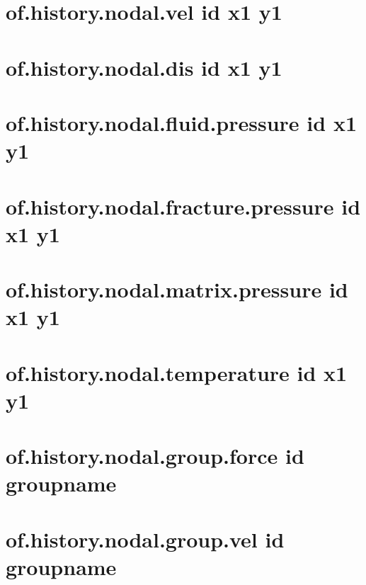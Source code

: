 \documentclass[letterpaper,10pt,english]{sphinxmanual}
\begin{document}
\section{of.history.nodal.vel id x1 y1}
\label{\detokenize{rst_tutorials/command_line_guide:of-history-nodal-vel-id-x1-y1}}

\section{of.history.nodal.dis id x1 y1}
\label{\detokenize{rst_tutorials/command_line_guide:of-history-nodal-dis-id-x1-y1}}

\section{of.history.nodal.fluid.pressure id x1 y1}
\label{\detokenize{rst_tutorials/command_line_guide:of-history-nodal-fluid-pressure-id-x1-y1}}

\section{of.history.nodal.fracture.pressure id x1 y1}
\label{\detokenize{rst_tutorials/command_line_guide:of-history-nodal-fracture-pressure-id-x1-y1}}

\section{of.history.nodal.matrix.pressure id x1 y1}
\label{\detokenize{rst_tutorials/command_line_guide:of-history-nodal-matrix-pressure-id-x1-y1}}

\section{of.history.nodal.temperature id x1 y1}
\label{\detokenize{rst_tutorials/command_line_guide:of-history-nodal-temperature-id-x1-y1}}

\section{of.history.nodal.group.force id groupname}
\label{\detokenize{rst_tutorials/command_line_guide:of-history-nodal-group-force-id-groupname}}\label{\detokenize{rst_tutorials/command_line_guide:section-17}}

\section{of.history.nodal.group.vel id groupname}
\label{\detokenize{rst_tutorials/command_line_guide:of-history-nodal-group-vel-id-groupname}}
\end{document}
